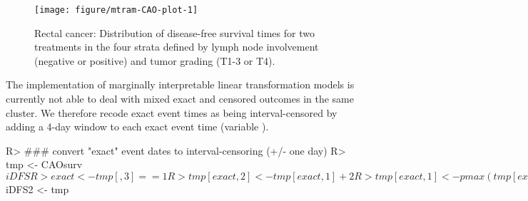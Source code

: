 \documentclass[article,nojss,shortnames]{jss}\usepackage[]{graphicx}\usepackage[]{xcolor}
\begin{document}
\begin{figure}[t]
\begin{Schunk}


{\centering \texttt{[image: figure/mtram-CAO-plot-1]} 

}

\end{Schunk}
\caption{Rectal cancer: Distribution of disease-free survival times for two
         treatments in the four strata defined by lymph node involvement
         (negative or positive) and tumor grading (T1-3 or T4). \label{fig:CAO}}
\end{figure}

The implementation of marginally interpretable
linear transformation models is currently not able to
deal with mixed exact and censored outcomes in the same cluster. We
therefore recode exact event times as being interval-censored by adding a
4-day window to each exact event time (variable ).

\begin{Schunk}
\begin{Sinput}
R> ### convert "exact" event dates to interval-censoring (+/- one day)
R> tmp <- CAOsurv$iDFS
R> exact <- tmp[,3] == 1 
R> tmp[exact,2] <- tmp[exact,1] + 2
R> tmp[exact,1] <- pmax(tmp[exact,1] - 2, 0)
R> tmp[exact,3] <- 3
R> CAOsurv$iDFS2 <- tmp
\end{Sinput}
\end{Schunk}
\end{document}
